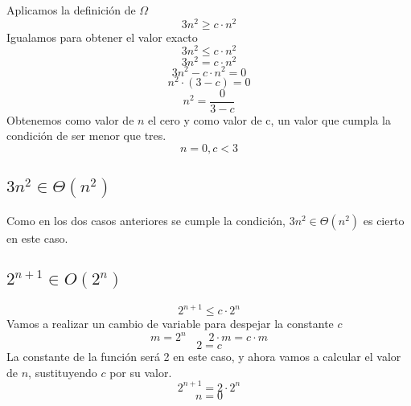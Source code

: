 \begin{twocolumn}
Aplicamos la definición de $\Omega$
\begin{displaymath}
3n^2 \geq c \cdot n^2
\end{displaymath}
Igualamos para obtener el valor exacto
\begin{displaymath}
3n^2 \leq c \cdot n^2
\end{displaymath}
\begin{displaymath}
3n^2 = c \cdot n^2
\end{displaymath}
\begin{displaymath}
3n^2 - c \cdot n^2 = 0
\end{displaymath}
\begin{displaymath}
n^2 \cdot (3 - c) = 0
\end{displaymath}
\begin{displaymath}
n^2 = \frac{0}{3 - c}
\end{displaymath}
Obtenemos como valor de $n$ el cero y como valor de c, un valor que cumpla la condición de ser menor que tres.
\begin{displaymath}
n = 0, c < 3
\end{displaymath}

\subsection{$3n^2 \in \Theta(n^2)$}


Como en los dos casos anteriores se cumple la condición, $3n^2 \in \Theta(n^2)$ es cierto en este caso.

\subsection{$2^{n+1} \in O(2^n)$}

\begin{displaymath}
2^{n+1} \leq c \cdot 2^{n}
\end{displaymath}
Vamos a realizar un cambio de variable para despejar la constante $c$
\begin{displaymath}
m = 2^n \qquad 2 \cdot m = c \cdot m
\end{displaymath}
\begin{displaymath}
2 = c
\end{displaymath}
La constante de la función será 2 en este caso, y ahora vamos a calcular el valor de $n$, sustituyendo $c$ por su valor.
\begin{displaymath}
2^{n+1} = 2 \cdot 2^n
\end{displaymath}
\begin{displaymath}
n = 0
\end{displaymath}


\end{twocolumn}

